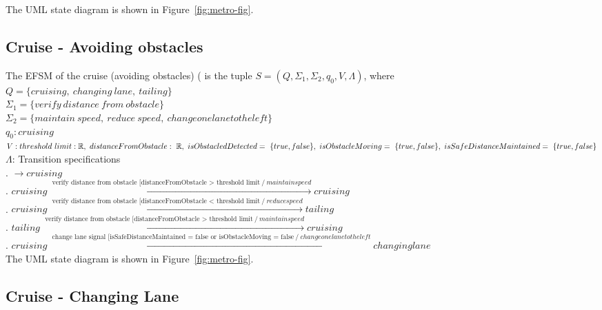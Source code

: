 \documentclass[12pt]{article}
\begin{document}
\begin{spacing}{1.5}
\noindent The UML state diagram is shown in Figure~\ref{fig:metro-fig}.
\newpage

\subsection{Cruise - Avoiding obstacles}

\noindent The EFSM of the cruise (avoiding obstacles) ( is the tuple $S = (Q, \Sigma_1, \Sigma_2, q_0, V, \Lambda)$, where\\

\noindent $Q = \{cruising,~changing~lane,~tailing\}$\\
\noindent $\Sigma_1 = \{verify~distance~from~obstacle\}$\\
\noindent $\Sigma_2 = \{maintain~speed,~reduce~speed,~change one lane to the left\}$\\
\noindent $q_0: cruising$\\
\noindent $V: threshold~limit: \mathbb R,~distanceFromObstacle:~ \mathbb R,~isObstacledDetected=~\{true, false\},\newline~isObstacleMoving=~\{true,false\},~isSafeDistanceMaintained=~\{true,false\}$\\
\noindent $\Lambda$: Transition specifications\\
. $\rightarrow cruising$\\
. $cruising \xrightarrow {\text { verify distance from obstacle [distanceFromObstacle > threshold limit}~/ ~maintain speed} cruising$\\
. $cruising \xrightarrow {\text { verify distance from obstacle [distanceFromObstacle < threshold limit}~/ ~reduce speed} tailing$\\
. $tailing \xrightarrow {\text { verify distance from obstacle [distanceFromObstacle > threshold limit}~/ ~maintain speed} cruising$\\
. $cruising \xrightarrow {\text { change lane signal [isSafeDistanceMaintained = false or isObstacleMoving = false}~/ ~change one lane to the left} changing lane$\\


\noindent The UML state diagram is shown in Figure~\ref{fig:metro-fig}.

\newpage


\subsection{Cruise - Changing Lane}


\end{spacing}
\end{document}
